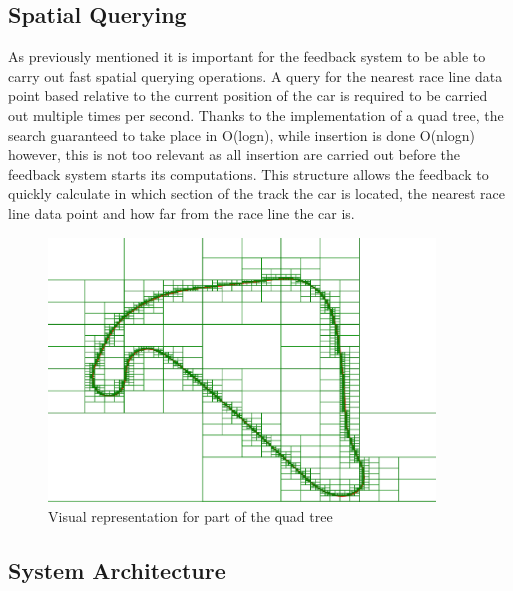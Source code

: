 \subsection{Spatial Querying}
As previously mentioned it is important for the feedback system to be able to carry out fast spatial querying operations. A query for the nearest race line data point based relative to the current position of the car is required to be carried out multiple times per second. Thanks to the implementation of a quad tree, the search guaranteed to take place in O(logn), while insertion is done O(nlogn) however, this is not too relevant as all insertion are carried out before the feedback system starts its computations. This structure allows the feedback to quickly calculate in which section of the track the car is located, the nearest race line data point and how far from the race line the car is.

\begin{figure}[!htb]
	\centering
	\includegraphics[height=7cm]{images/QuadTree}
	\caption{Visual representation for part of the quad tree}
	\label{fig:QuadTree}
\end{figure}

\subsection{System Architecture}

